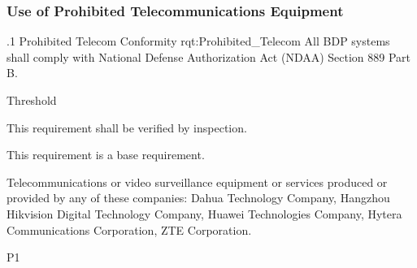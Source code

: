 \subsubsection{Use of Prohibited Telecommunications Equipment}
\label{sssec_Prohibited_Telecom}


\ONERQMTV
{\RqtNumberBase.1}
{Prohibited Telecom Conformity}
{rqt:Prohibited_Telecom}
{All BDP systems shall comply with National Defense Authorization Act (NDAA) Section 889 Part B.}
{
	\item [Phase 1] Threshold
}
{This requirement shall be verified by inspection.}
{
\item This requirement is a base requirement.
}
{
	\item Telecommunications or video surveillance equipment or services produced or provided by any of these companies: Dahua Technology Company, Hangzhou Hikvision Digital Technology Company, Huawei Technologies Company, Hytera Communications Corporation, ZTE Corporation.
}
{P1}
